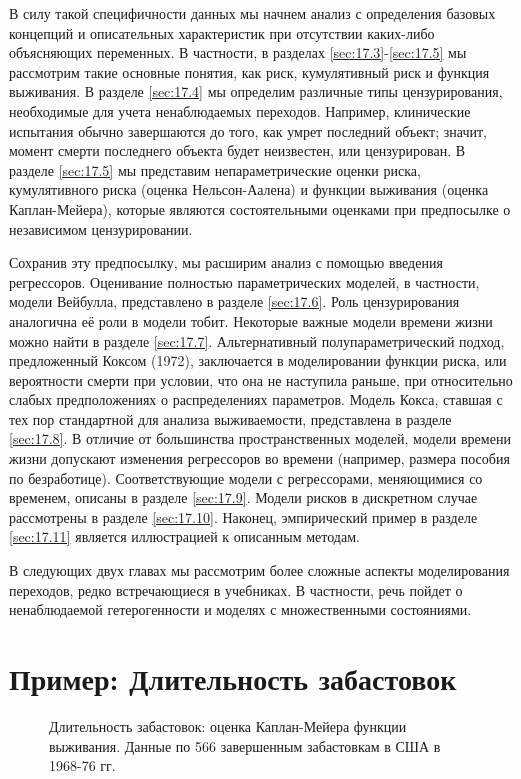 В силу такой специфичности данных мы начнем анализ с определения базовых концепций и описательных характеристик при отсутствии каких-либо объясняющих переменных. В частности, в разделах \ref{sec:17.3}-\ref{sec:17.5} мы рассмотрим такие основные понятия, как риск, кумулятивный риск и функция выживания. В разделе \ref{sec:17.4} мы определим различные типы цензурирования, необходимые для учета ненаблюдаемых переходов. Например, клинические испытания обычно завершаются до того, как умрет последний объект; значит, момент смерти последнего объекта будет неизвестен, или цензурирован. В разделе \ref{sec:17.5} мы представим непараметрические оценки риска, кумулятивного риска (оценка Нельсон-Аалена) и функции выживания (оценка Каплан-Мейера), которые являются состоятельными оценками при предпосылке о независимом цензурировании.

Сохранив эту предпосылку, мы расширим анализ с помощью введения регрессоров. Оценивание полностью параметрических моделей, в частности, модели Вейбулла, представлено в разделе \ref{sec:17.6}. Роль цензурирования аналогична её роли в модели тобит. Некоторые важные модели времени жизни можно найти в разделе \ref{sec:17.7}. Альтернативный полупараметрический подход, предложенный Коксом (1972), заключается в моделировании функции риска, или вероятности смерти при условии, что она не наступила раньше, при относительно слабых предположениях о распределениях параметров. Модель Кокса, ставшая с тех пор стандартной для анализа выживаемости, представлена в разделе \ref{sec:17.8}. В отличие от большинства пространственных моделей, модели времени жизни допускают изменения регрессоров во времени (например, размера пособия по безработице). Соответствующие модели с регрессорами, меняющимися со временем, описаны в разделе \ref{sec:17.9}. Модели рисков в дискретном случае рассмотрены в разделе \ref{sec:17.10}. Наконец, эмпирический пример в разделе \ref{sec:17.11} является иллюстрацией к описанным методам.

В следующих двух главах мы рассмотрим более сложные аспекты моделирования переходов, редко встречающиеся в учебниках. В частности, речь пойдет о ненаблюдаемой гетерогенности и моделях с множественными состояниями.




\section{Пример: Длительность забастовок}\label{sec:17.2}

\begin{figure}[ht!]\caption{Длительность забастовок: оценка Каплан-Мейера функции выживания. Данные по 566 завершенным забастовкам в США в 1968-76 гг.}\label{fig:17.1}
\centering
\end{figure}

